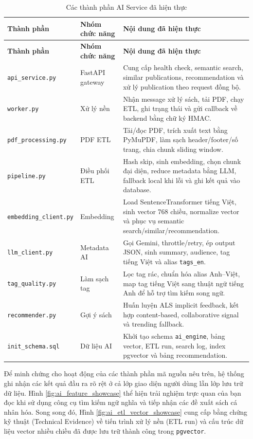 \begin{longtable}{|p{3.8cm}|p{4cm}|p{6.5cm}|}
\caption{Các thành phần AI Service đã hiện thực}
\label{tab:ai_components_implemented}\\
\hline
\textbf{Thành phần} & \textbf{Nhóm chức năng} & \textbf{Nội dung đã hiện thực} \\
\hline
\endfirsthead
\hline
\textbf{Thành phần} & \textbf{Nhóm chức năng} & \textbf{Nội dung đã hiện thực} \\
\hline
\endhead
\texttt{api\_service.py} & FastAPI gateway &
Cung cấp health check, semantic search, similar publications, recommendation và
xử lý publication theo request đồng bộ. \\
\hline
\texttt{worker.py} & Xử lý nền &
Nhận message xử lý sách, tải PDF, chạy ETL, ghi trạng thái và gửi callback về
backend bằng chữ ký HMAC. \\
\hline
\texttt{pdf\_processing.py} & PDF ETL &
Tải/đọc PDF, trích xuất text bằng PyMuPDF, làm sạch header/footer/số trang, chia
chunk sliding window. \\
\hline
\texttt{pipeline.py} & Điều phối ETL &
Hash skip, sinh embedding, chọn chunk đại diện, reduce metadata bằng LLM, fallback
local khi lỗi và ghi kết quả vào database. \\
\hline
\texttt{embedding\_client.py} & Embedding &
Load SentenceTransformer tiếng Việt, sinh vector 768 chiều, normalize vector và
phục vụ semantic search/similar/recommendation. \\
\hline
\texttt{llm\_client.py} & Metadata AI &
Gọi Gemini, throttle/retry, ép output JSON, sinh summary, audience, tag tiếng
Việt và alias \texttt{tags\_en}. \\
\hline
\texttt{tag\_quality.py} & Làm sạch tag &
Lọc tag rác, chuẩn hóa alias Anh--Việt, map tag tiếng Việt sang thuật ngữ tiếng
Anh để hỗ trợ tìm kiếm song ngữ. \\
\hline
\texttt{recommender.py} & Gợi ý sách &
Huấn luyện ALS implicit feedback, kết hợp content-based, collaborative signal và
trending fallback. \\
\hline
\texttt{init\_schema.sql} & Dữ liệu AI &
Khởi tạo schema \texttt{ai\_engine}, bảng vector, ETL run, search log, index
pgvector và bảng recommendation. \\
\hline
\end{longtable}

Để minh chứng cho hoạt động của các thành phần mã nguồn nêu trên, hệ thống ghi nhận các kết quả đầu ra rõ rệt ở cả lớp giao diện người dùng lẫn lớp lưu trữ dữ liệu. Hình \ref{fig:ai_feature_showcase} thể hiện trải nghiệm trực quan của bạn đọc khi sử dụng công cụ tìm kiếm ngữ nghĩa và tiếp nhận các đề xuất sách cá nhân hóa. Song song đó, Hình \ref{fig:ai_etl_vector_showcase} cung cấp bằng chứng kỹ thuật (Technical Evidence) về tiến trình xử lý nền (ETL run) và cấu trúc dữ liệu vector nhiều chiều đã được lưu trữ thành công trong \texttt{pgvector}.

